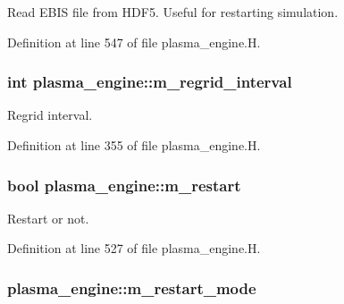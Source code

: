 Read E\+B\+IS file from H\+D\+F5. Useful for restarting simulation. 



Definition at line 547 of file plasma\+\_\+engine.\+H.

\subsubsection[{\texorpdfstring{m\+\_\+regrid\+\_\+interval}{m_regrid_interval}}]{\setlength{\rightskip}{0pt plus 5cm}int plasma\+\_\+engine\+::m\+\_\+regrid\+\_\+interval\hspace{0.3cm}{\ttfamily [protected]}}\hypertarget{classplasma__engine_a7b2c464f655a22bd9968255e3161fb33}{}\label{classplasma__engine_a7b2c464f655a22bd9968255e3161fb33}


Regrid interval. 



Definition at line 355 of file plasma\+\_\+engine.\+H.

\subsubsection[{\texorpdfstring{m\+\_\+restart}{m_restart}}]{\setlength{\rightskip}{0pt plus 5cm}bool plasma\+\_\+engine\+::m\+\_\+restart\hspace{0.3cm}{\ttfamily [protected]}}\hypertarget{classplasma__engine_a3c9c6832efb6b89c27bb87f9b3c78709}{}\label{classplasma__engine_a3c9c6832efb6b89c27bb87f9b3c78709}


Restart or not. 



Definition at line 527 of file plasma\+\_\+engine.\+H.

\subsubsection[{\texorpdfstring{m\+\_\+restart\+\_\+mode}{m_restart_mode}}]{ plasma\+\_\+engine\+::m\+\_\+restart\+\_\+mode\hspace{0.3cm}{\ttfamily [protected]}}\hypertarget{classplasma__engine_a71668180ba2568d17a8bce82321ffcc3}{}\label{classplasma__engine_a71668180ba2568d17a8bce82321ffcc3}


